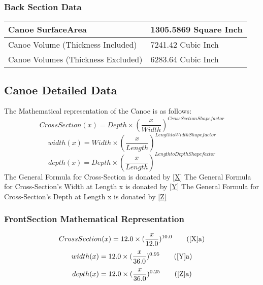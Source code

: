 \documentclass{article}%
\begin{document}
%
\subsubsection{Back Section Data}%
\label{ssubsec:BackSectionData}%
\begin{tabular}{|l|l|}%
\hline%
Canoe SurfaceArea&1305.5869 Square Inch\\%
\hline%
Canoe Volume (Thickness Included)&7241.42 Cubic Inch\\%
\hline%
Canoe Volumes (Thickness Excluded)&6283.64 Cubic Inch\\%
\hline%
\end{tabular}

%
\subsection{Canoe Detailed Data}%
\label{subsec:CanoeDetailedData}%
The Mathematical representation of the Canoe is as follows: %
\newline%
%
\begin{equation}%
CrossSection(x) = Depth\times(\frac{x}{Width})^{CrossSection Shape factor} \label{X}%
\end{equation}%
\begin{equation}%
width(x) = Width\times(\frac{x}{Length})^{Length to Width Shape factor} \label{Y}%
\end{equation}%
\begin{equation}%
depth(x) = Depth\times(\frac{x}{Length})^{Length to Depth Shape factor} \label{Z}%
\end{equation}%
\newline%
%
The General Formula for Cross-Section is donated by \eqref{X}%
\newline%
%
The General Formula for Cross-Section's Width at Length x is donated by \eqref{Y}%
\newline%
%
The General Formula for Cross-Section's Depth at Length x is donated by \eqref{Z}%
\newline%
%
\subsubsection{FrontSection Mathematical Representation}%
\label{ssubsec:FrontSectionMathematicalRepresentation}%
\begin{equation}%
CrossSection(x) = 12.0\times(\frac{x}{12.0})^{10.0} \tag{\ref{X}{a}}%
\end{equation}%
\begin{equation}%
width(x) = 12.0\times(\frac{x}{36.0})^{0.95} \tag{\ref{Y}{a}}%
\end{equation}%
\begin{equation}%
depth(x) = 12.0\times(\frac{x}{36.0})^{0.25} \tag{\ref{Z}{a}}%
\end{equation}
\end{document}

